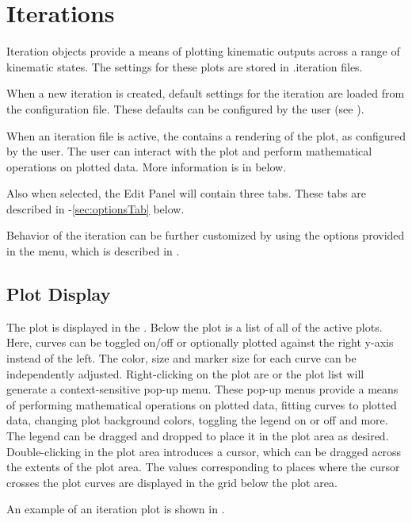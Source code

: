 \chapter{Iterations} \label{ch:iterations}

Iteration objects provide a means of plotting kinematic outputs across a range of kinematic states.  The settings for these plots are stored in .iteration files.

When a new iteration is created, default settings for the iteration are loaded from the configuration file.  These defaults can be configured by the user (see ).

When an iteration file is active, the  contains a rendering of the plot, as configured by the user.  The user can interact with the plot and perform mathematical operations on plotted data.  More information is in  below.

Also when selected, the Edit Panel will contain three tabs.  These tabs are described in -\ref{sec:optionsTab} below.

Behavior of the iteration can be further customized by using the options provided in the  menu, which is described in .

\section{Plot Display} \label{sec:plotDisplay}

The plot is displayed in the .  Below the plot is a list of all of the active plots.  Here, curves can be toggled on/off or optionally plotted against the right y-axis instead of the left.  The color, size and marker size for each curve can be independently adjusted.  Right-clicking on the plot are or the plot list will generate a context-sensitive pop-up menu.  These pop-up menus provide a means of performing mathematical operations on plotted data, fitting curves to plotted data, changing plot background colors, toggling the legend on or off and more.  The legend can be dragged and dropped to place it in the plot area as desired.  Double-clicking in the plot area introduces a cursor, which can be dragged across the extents of the plot area.  The values corresponding to places where the cursor crosses the plot curves are displayed in the grid below the plot area.

An example of an iteration plot is shown in .

